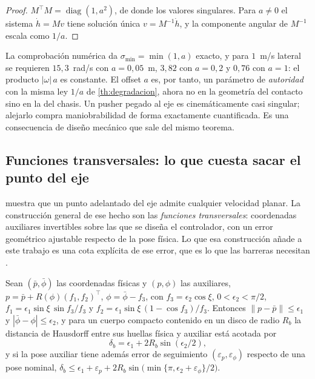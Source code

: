 \begin{proof}
$M^{\!\top}M=\operatorname{diag}(1,a^{2})$, de donde los valores singulares. Para
$a\neq0$ el sistema $\dot h=Mv$ tiene solución única
$v=M^{-1}\dot h$, y la componente angular de $M^{-1}$ escala como $1/a$.
\end{proof}

\begin{observacion}
\label{obs:fuera-eje-degradacion}
La comprobación numérica da $\sigma_{\min}=\min(1,a)$ exacto, y para $1$~m/s
lateral se requieren $15{,}3$~rad/s con $a=0{,}05$~m, $3{,}82$ con $a=0{,}2$ y
$0{,}76$ con $a=1$: el producto $|\omega|\,a$ es constante. El offset $a$ es,
por tanto, un parámetro de \emph{autoridad} con la misma ley $1/a$ de
\cref{th:degradacion}, ahora no en la geometría del contacto sino en la del
chasis. Un pusher pegado al eje es cinemáticamente casi singular; alejarlo
compra maniobrabilidad de forma exactamente cuantificada. Es una consecuencia de
diseño mecánico que sale del mismo teorema.
\end{observacion}

\subsection{Funciones transversales: lo que cuesta sacar el punto del eje}

 muestra que un punto adelantado del eje admite cualquier
velocidad planar. La construcción general de ese hecho son las \emph{funciones
transversales}: coordenadas auxiliares invertibles sobre las que se diseña el
controlador, con un error geométrico ajustable respecto de la pose física. Lo que
esa construcción añade a este trabajo es una cota explícita de ese error, que es
lo que las barreras necesitan \cite{mayorga2026m1}.

\begin{proposicion}
\label{pr:huella-transversal}
Sean $(\bar p,\bar\phi)$ las coordenadas físicas y $(p,\phi)$ las auxiliares,
$p=\bar p+R(\phi)(f_1,f_2)^{\!\top}$, $\phi=\bar\phi-f_3$, con
$f_3=\epsilon_2\cos\xi$, $0<\epsilon_2<\pi/2$,
$f_1=\epsilon_1\sin\xi\,\sin f_3/f_3$ y $f_2=\epsilon_1\sin\xi\,(1-\cos f_3)/f_3$.
Entonces $\lVert p-\bar p\rVert\le\epsilon_1$ y $|\bar\phi-\phi|\le\epsilon_2$, y
para un cuerpo compacto contenido en un disco de radio $R_b$ la distancia de
Hausdorff entre sus huellas física y auxiliar está acotada por
\[
  \delta_b=\epsilon_1+2R_b\sin(\epsilon_2/2),
\]
y si la pose auxiliar tiene además error de seguimiento $(\varepsilon_p,\varepsilon_\phi)$
respecto de una pose nominal,
$\delta_b\le\epsilon_1+\varepsilon_p+2R_b\sin\bigl(\min\{\pi,\epsilon_2+\varepsilon_\phi\}/2\bigr)$.
\end{proposicion}


